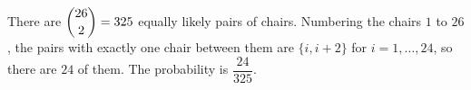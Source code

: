 There are $\dbinom{26}{2}=325$ equally likely pairs of chairs. Numbering the chairs $1$ to $26$, the pairs with exactly one chair between them are $\{i,i+2\}$ for $i=1,\dots,24$, so there are $24$ of them. The probability is $\boxed{\dfrac{24}{325}}$.
